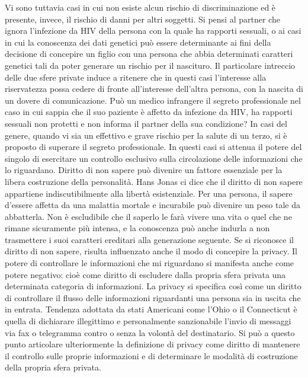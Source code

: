 Vi sono tuttavia casi in cui non esiste alcun rischio di discriminazione ed è presente, invece, il rischio di danni per altri soggetti. Si pensi al partner che ignora l’infezione da HIV della persona con la quale ha rapporti sessuali, o ai casi in cui la conoscenza dei dati genetici può essere determinante ai fini della decisione di concepire un figlio con una persona che abbia determinati caratteri genetici tali da poter generare un rischio per il nascituro. Il particolare intreccio delle due sfere private induce a ritenere che in questi casi l’interesse alla riservatezza possa cedere di fronte all’interesse dell’altra persona, con la nascita di un dovere di comunicazione.
Può un medico infrangere il segreto professionale nel caso in cui sappia che il suo paziente è affetto da infezione da HIV, ha rapporti sessuali non protetti e non informa il partner della sua condizione? In casi del genere, quando vi sia un effettivo e grave rischio per la salute di un terzo, si è proposto di superare il segreto professionale. In questi casi si attenua il potere del singolo di esercitare un controllo esclusivo sulla circolazione delle informazioni che lo riguardano.
Diritto di non sapere può divenire un fattore essenziale per la libera costruzione della personalità.
Hans Jonas ci dice che il diritto di non sapere appartiene indiscutibilmente alla libertà esistenziale. Per una persona, il sapere d’essere affetta da una malattia mortale e incurabile può divenire un peso tale da abbatterla. Non è escludibile che il saperlo le farà vivere una vita o quel che ne rimane sicuramente più intensa, e la conoscenza può anche indurla a non trasmettere i suoi caratteri ereditari alla generazione seguente.
Se si riconosce il diritto di non sapere, risulta influenzato anche il modo di concepire la privacy. Il potere di controllare le informazioni che mi riguardano si manifesta anche come potere negativo: cioè come diritto di escludere dalla propria sfera privata una determinata categoria di informazioni. La privacy si specifica così come un diritto di controllare il flusso delle informazioni riguardanti una persona sia in uscita che in entrata. Tendenza adottata da stati Americani come l’Ohio o il Connecticut è quella di dichiarare illegittimo e personalmente sanzionabile l’invio di messaggi via fax o telegramma contro o senza la volontà del destinatario.
Si può a questo punto articolare  ulteriormente la definizione di privacy come diritto di mantenere il controllo sulle proprie informazioni e di determinare le modalità di costruzione della propria sfera privata.

